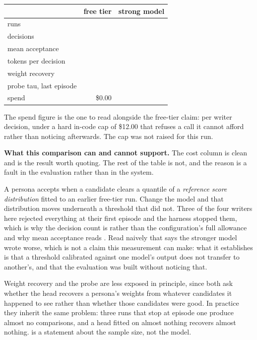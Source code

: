 \documentclass{article}
\begin{document}
\begin{center}
\begin{tabular}{@{}lrr@{}}
\toprule
& \textbf{free tier} & \textbf{strong model} \\
\midrule
runs & \rLiveRunCount{} & \rMeteredRunCount{} \\
decisions & \rLiveDecisionsTotal{} & \rMeteredDecisionsTotal{} \\
mean acceptance & \rLiveAcceptanceMean{} & \rMeteredAcceptanceMean{} \\
tokens per decision & \rLiveTokensPerAction{} & \rMeteredTokensPerAction{} \\
weight recovery & \rLiveWeightRecoveryMean{} & \rMeteredWeightRecoveryMean{} \\
probe tau, last episode & \rProbeTauLast{} & \rMeteredProbeTauLast{} \\
spend & \$0.00 & \rMeteredSpend{} \\
\bottomrule
\end{tabular}
\end{center}

The spend figure is the one to read alongside the free-tier claim: \rMeteredUsdPerDecision{}
per writer decision, under a hard in-code cap of \$12.00 that refuses a call it cannot
afford rather than noticing afterwards. The cap was not raised for this run.

\textbf{What this comparison can and cannot support.} The cost column is clean and is the
result worth quoting. The rest of the table is not, and the reason is a fault in the
evaluation rather than in the system.

A persona accepts when a candidate clears a quantile of a \emph{reference score
distribution} fitted to an earlier free-tier run. Change the model and that distribution
moves underneath a threshold that did not. Three of the four writers here rejected everything
at their first episode and the harness stopped them, which is why the decision count is
\rMeteredDecisionsTotal{} rather than the configuration's full allowance and why mean
acceptance reads \rMeteredAcceptanceMean{}. Read naively that says the stronger model wrote
worse, which is not a claim this measurement can make: what it establishes is that a
threshold calibrated against one model's output does not transfer to another's, and that the
evaluation was built without noticing that.

Weight recovery and the probe are less exposed in principle, since both ask whether the head
recovers a persona's weights from whatever candidates it happened to see rather than whether
those candidates were good. In practice they inherit the same problem: three runs that stop at
episode one produce almost no comparisons, and a head fitted on almost nothing recovers almost
nothing. \rMeteredWeightRecoveryMean{} is a statement about the sample size, not the model.
\end{document}
